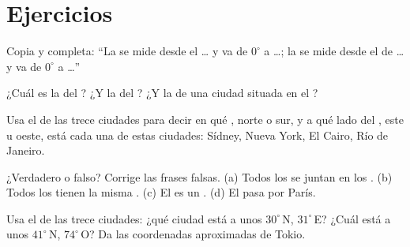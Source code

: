 \section{Ejercicios}

\begin{exercise}[$\star$]\label{exo:g6:latitude-longitude:1}
Copia y completa: ``La  se mide desde el \ldots{} y va de $0^\circ$
a \ldots; la  se mide desde el  de \ldots{} y va de
$0^\circ$ a \ldots''
\end{exercise}

\begin{exercise}[$\star$]\label{exo:g6:latitude-longitude:2}
¿Cuál es la  del ? ¿Y la del ? ¿Y la de una ciudad
situada en el ?
\end{exercise}

\begin{exercise}[$\star$]\label{exo:g6:latitude-longitude:3}
Usa el  de las trece ciudades para decir en qué , norte o
sur, y a qué lado del , este u oeste, está cada una de
estas ciudades: Sídney, Nueva York, El Cairo, Río de Janeiro.
\end{exercise}

\begin{exercise}[$\star$]\label{exo:g6:latitude-longitude:4}
¿Verdadero o falso? Corrige las frases falsas.
(a) Todos los  se juntan en los .
(b) Todos los  tienen la misma .
(c) El  es un .
(d) El  pasa por París.
\end{exercise}

\begin{exercise}[$\star\star$]\label{exo:g6:latitude-longitude:5}
Usa el  de las trece ciudades: ¿qué ciudad está a unos
$30^\circ$\,N, $31^\circ$\,E? ¿Cuál está a unos $41^\circ$\,N,
$74^\circ$\,O? Da las coordenadas aproximadas de Tokio.
\end{exercise}

